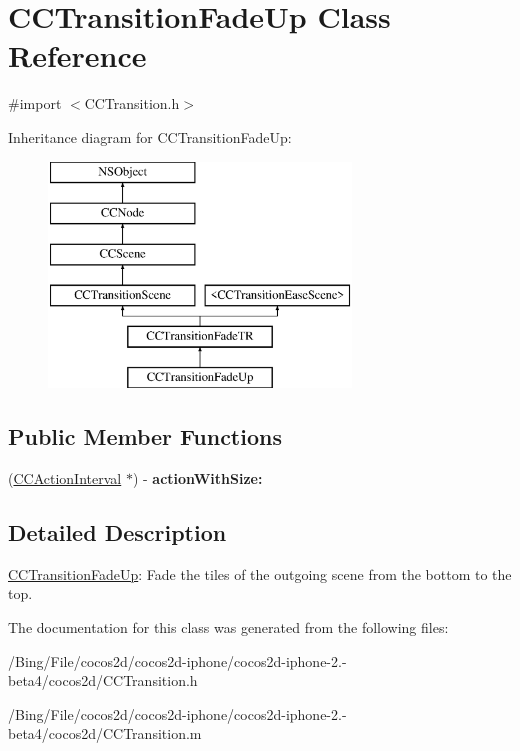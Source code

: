 \hypertarget{interface_c_c_transition_fade_up}{\section{C\-C\-Transition\-Fade\-Up Class Reference}
\label{interface_c_c_transition_fade_up}
}


{\ttfamily \#import $<$C\-C\-Transition.\-h$>$}

Inheritance diagram for C\-C\-Transition\-Fade\-Up\-:\begin{figure}[H]
\begin{center}
\leavevmode
\includegraphics[height=6.000000cm]{interface_c_c_transition_fade_up}
\end{center}
\end{figure}
\subsection*{Public Member Functions}
\begin{DoxyCompactItemize}
\item 
\hypertarget{interface_c_c_transition_fade_up_a982b9090134ae38049d18fbfa116125b}{(\hyperlink{class_c_c_action_interval}{C\-C\-Action\-Interval} $\ast$) -\/ {\bfseries action\-With\-Size\-:}}\label{interface_c_c_transition_fade_up_a982b9090134ae38049d18fbfa116125b}

\end{DoxyCompactItemize}


\subsection{Detailed Description}
\hyperlink{interface_c_c_transition_fade_up}{C\-C\-Transition\-Fade\-Up}\-: Fade the tiles of the outgoing scene from the bottom to the top. 

The documentation for this class was generated from the following files\-:\begin{DoxyCompactItemize}
\item 
/\-Bing/\-File/cocos2d/cocos2d-\/iphone/cocos2d-\/iphone-\/2.-\/beta4/cocos2d/C\-C\-Transition.\-h\item 
/\-Bing/\-File/cocos2d/cocos2d-\/iphone/cocos2d-\/iphone-\/2.-\/beta4/cocos2d/C\-C\-Transition.\-m\end{DoxyCompactItemize}
